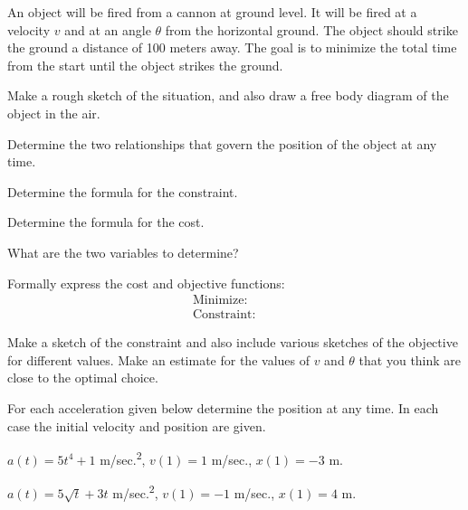 \begin{problem}
\item An object will be fired from a cannon at ground level. It will
  be fired at a velocity $v$ and at an angle $\theta$ from the
  horizontal ground.  The object should strike the ground a distance
  of 100 meters away. The goal is to minimize the total time from the
  start until the object strikes the ground.
  \begin{subproblem}
  \item Make a rough sketch of the situation, and also draw a free
    body diagram of the object in the air.
    \vfill
  \item Determine the two relationships that govern the position of
    the object at any time.
    \vfill
  \item Determine the formula for the constraint.
    \vfill
  \item Determine the formula for the cost.
    \vfill

    \clearpage

  \item What are the two variables to determine?
    \vspace{2em}

  \item Formally express the cost and objective functions:
    \begin{eqnarray*}
      \mathrm{Minimize:} & &  \\
      \mathrm{Constraint:} & &
    \end{eqnarray*}


  \item Make a sketch of the constraint and also include various
    sketches of the objective for different values. Make an estimate
    for the values of $v$ and $\theta$ that you think are close to the
    optimal choice.

    \vfill

  \item

  \end{subproblem}

\end{problem}




\begin{problem}
\item For each acceleration given below determine the position at any
  time. In each case the initial velocity and position are given.
  \begin{subproblem}
  \item $a(t)=5t^4+1$ m/sec.\textsuperscript{2}, $v(1)=1$ m/sec.,
    $x(1)=-3$ m.
    \vfill
  \item $a(t)=5\sqrt{t}+3t$ m/sec.\textsuperscript{2}, $v(1)=-1$ m/sec.,
    $x(1)=4$ m.
    \vfill
  \end{subproblem}
\end{problem}


